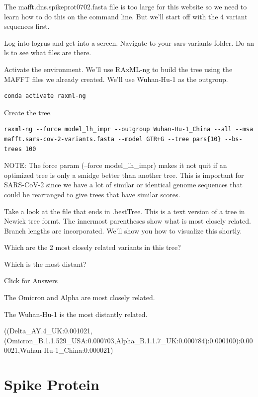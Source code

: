 \documentclass[
]{book}
\begin{document}
\hfill\break

The mafft.dns.spikeprot0702.fasta file is too large for this website so we need to learn how to do this on the command line. But we'll start off with the 4 variant sequences first.

Log into logrus and get into a screen. Navigate to your sars-variants folder. Do an ls to see what files are there.

Activate the environment. We'll use RAxML-ng to build the tree using the MAFFT files we already created. We'll use Wuhan-Hu-1 as the outgroup.

\begin{verbatim}
conda activate raxml-ng
\end{verbatim}

Create the tree.

\begin{verbatim}
raxml-ng --force model_lh_impr --outgroup Wuhan-Hu-1_China --all --msa mafft.sars-cov-2-variants.fasta --model GTR+G --tree pars{10} --bs-trees 100
\end{verbatim}

NOTE: The force param (--force model\_lh\_impr) makes it not quit if an optimized tree is only a smidge better than another tree. This is important for SARS-CoV-2 since we have a lot of similar or identical genome sequences that could be rearranged to give trees that have similar scores.

Take a look at the file that ends in .bestTree. This is a text version of a tree in Newick tree formt. The innermost parentheses show what is most closely related. Branch lengths are incorporated. We'll show you how to visualize this shortly.

Which are the 2 most closely related variants in this tree?

Which is the most distant?

Click for Answers

The Omicron and Alpha are most closely related.

The Wuhan-Hu-1 is the most distantly related.

((Delta\_AY.4\_UK:0.001021,(Omicron\_B.1.1.529\_USA:0.000703,Alpha\_B.1.1.7\_UK:0.000784):0.000100):0.000021,Wuhan-Hu-1\_China:0.000021)

\hypertarget{spike-protein}{%
\section{Spike Protein}\label{spike-protein}}
\end{document}
